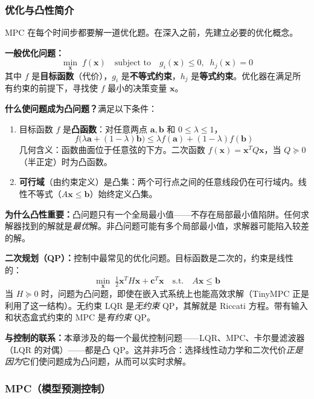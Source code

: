 \subsubsection{优化与凸性简介}

MPC 在每个时间步都要解一道优化题。在深入之前，先建立必要的优化概念。

\textbf{一般优化问题：}
\[
\min_{\mathbf{x}} \; f(\mathbf{x}) \quad \text{subject to} \quad g_i(\mathbf{x}) \leq 0, \;\; h_j(\mathbf{x}) = 0
\]
其中 $f$ 是\textbf{目标函数}（代价），$g_i$ 是\textbf{不等式约束}，$h_j$ 是\textbf{等式约束}。优化器在满足所有约束的前提下，寻找使 $f$ 最小的决策变量 $\mathbf{x}$。

\textbf{什么使问题成为凸问题？}满足以下条件：
\begin{enumerate}[nosep]
    \item 目标函数 $f$ 是\textbf{凸函数}：对任意两点 $\mathbf{a}, \mathbf{b}$ 和 $0 \leq \lambda \leq 1$，
    \[
    f\bigl(\lambda \mathbf{a} + (1-\lambda)\mathbf{b}\bigr) \leq \lambda f(\mathbf{a}) + (1-\lambda) f(\mathbf{b})
    \]
    几何含义：函数曲面位于任意弦的下方。二次函数 $f(\mathbf{x}) = \mathbf{x}^T Q \mathbf{x}$，当 $Q \succeq 0$（半正定）时为凸函数。
    \item \textbf{可行域}（由约束定义）是凸集：两个可行点之间的任意线段仍在可行域内。线性不等式（$A\mathbf{x} \leq \mathbf{b}$）始终定义凸集。
\end{enumerate}

\textbf{为什么凸性重要：}凸问题只有一个全局最小值——不存在局部最小值陷阱。任何求解器找到的解就是\textit{最优}解。非凸问题可能有多个局部最小值，求解器可能陷入较差的解。

\textbf{二次规划（QP）：}控制中最常见的优化问题。目标函数是二次的，约束是线性的：
\[
\min_{\mathbf{x}} \; \tfrac{1}{2}\mathbf{x}^T H \mathbf{x} + \mathbf{c}^T \mathbf{x} \quad \text{s.t.} \quad A\mathbf{x} \leq \mathbf{b}
\]
当 $H \succeq 0$ 时，问题为凸问题，即使在嵌入式系统上也能高效求解（TinyMPC 正是利用了这一结构）。无约束 LQR 是\textit{无约束} QP，其解就是 Riccati 方程。带有输入和状态盒式约束的 MPC 是\textit{有约束} QP。

\textbf{与控制的联系：}本章涉及的每一个最优控制问题——LQR、MPC、卡尔曼滤波器（LQR 的对偶）——都是凸 QP。这并非巧合：选择线性动力学和二次代价\textit{正是因为}它们使问题成为凸问题，从而可以实时求解。

\subsubsection{MPC（模型预测控制）}

